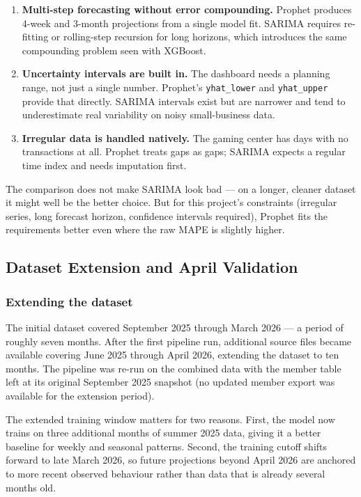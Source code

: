 \documentclass[12pt, a4paper]{report}
\begin{document}
\begin{enumerate}
  \item \textbf{Multi-step forecasting without error compounding.} Prophet
        produces 4-week and 3-month projections from a single model fit.
        SARIMA requires re-fitting or rolling-step recursion for long horizons,
        which introduces the same compounding problem seen with XGBoost.
  \item \textbf{Uncertainty intervals are built in.} The dashboard needs a
        planning range, not just a single number. Prophet's
        \texttt{yhat\_lower} and \texttt{yhat\_upper} provide that directly.
        SARIMA intervals exist but are narrower and tend to underestimate
        real variability on noisy small-business data.
  \item \textbf{Irregular data is handled natively.} The gaming center has
        days with no transactions at all. Prophet treats gaps as gaps;
        SARIMA expects a regular time index and needs imputation first.
\end{enumerate}

The comparison does not make SARIMA look bad --- on a longer, cleaner dataset
it might well be the better choice. But for this project's constraints (irregular
series, long forecast horizon, confidence intervals required), Prophet fits
the requirements better even where the raw MAPE is slightly higher.

\subsection{Dataset Extension and April Validation}
\label{sec:april_validation}

\subsubsection*{Extending the dataset}

The initial dataset covered September 2025 through March 2026 --- a period of
roughly seven months. After the first pipeline run, additional source files
became available covering June 2025 through April 2026, extending the dataset
to ten months. The pipeline was re-run on the combined data with the member
table left at its original September 2025 snapshot (no updated member export
was available for the extension period).

The extended training window matters for two reasons. First, the model now
trains on three additional months of summer 2025 data, giving it a better
baseline for weekly and seasonal patterns. Second, the training cutoff shifts
forward to late March 2026, so future projections beyond April 2026 are anchored
to more recent observed behaviour rather than data that is already several
months old.
\end{document}
